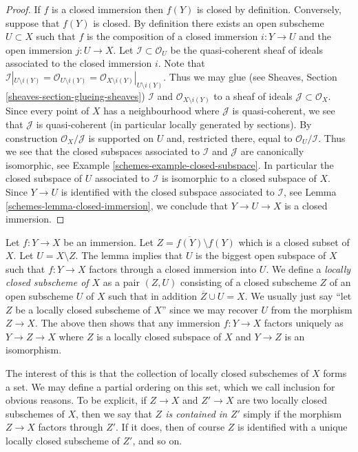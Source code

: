 \begin{proof}

If $f$ is a closed immersion then $f(Y)$ is closed by definition.
Conversely, suppose that $f(Y)$ is closed. By definition
there exists an open subscheme $U \subset X$ such that $f$ is the composition
of a closed immersion $i : Y \to U$ and the open immersion
$j : U \to X$. Let $\mathcal{I} \subset \mathcal{O}_U$ be the
quasi-coherent sheaf of ideals associated to the closed immersion
$i$. Note that
$\mathcal{I}|_{U \setminus i(Y)}
= \mathcal{O}_{U \setminus i(Y)}
= \mathcal{O}_{X \setminus i(Y)}|_{U \setminus i(Y)}$.
Thus we may glue (see Sheaves, Section \ref{sheaves-section-glueing-sheaves})
$\mathcal{I}$ and $\mathcal{O}_{X \setminus i(Y)}$ to a sheaf of
ideals $\mathcal{J} \subset \mathcal{O}_X$. Since every
point of $X$ has a neighbourhood where $\mathcal{J}$ is
quasi-coherent, we see that $\mathcal{J}$ is quasi-coherent
(in particular locally generated by sections).
By construction $\mathcal{O}_X/\mathcal{J}$ is supported
on $U$ and, restricted there, equal to $\mathcal{O}_U/\mathcal{I}$.
Thus we see that the closed subspaces associated to $\mathcal{I}$
and $\mathcal{J}$ are canonically isomorphic, see
Example \ref{schemes-example-closed-subspace}.
In particular the closed subspace of $U$ associated to $\mathcal{I}$
is isomorphic to a closed subspace of $X$.
Since $Y \to U$ is identified with the closed subspace
associated to $\mathcal{I}$, see Lemma \ref{schemes-lemma-closed-immersion},
we conclude that $Y \to U \to X$
is a closed immersion.
\end{proof}

Let $f : Y \to X$ be an immersion.
Let $Z = \overline{f(Y)} \setminus f(Y)$ which is a closed subset of $X$.
Let $U = X \setminus Z$.
The lemma implies that $U$ is the biggest open subspace of $X$
such that $f : Y \to X$ factors through a closed immersion into $U$.
We define a {\it locally closed subscheme of $X$} as a pair
$(Z, U)$ consisting of a closed subscheme $Z$ of an open subscheme $U$
of $X$ such that in addition $\overline{Z} \cup U = X$. We usually
just say ``let $Z$ be a locally closed subscheme of $X$'' since we may
recover $U$ from the morphism $Z \to X$. The above
then shows that any immersion $f : Y \to X$ factors uniquely
as $Y \to Z \to X$ where $Z$ is a locally closed subspace of $X$
and $Y \to Z$ is an isomorphism.

\medskip\noindent
The interest of this is that the collection of locally closed subschemes
of $X$ forms a set. We may define a partial ordering on this set,
which we call inclusion for obvious reasons. To be explicit, if
$Z \to X$ and $Z' \to X$ are two locally closed subschemes of $X$, then
we say that {\it $Z$ is contained in $Z'$} simply if the morphism
$Z \to X$ factors through $Z'$. If it does, then of course $Z$ is identified
with a unique locally closed subscheme of $Z'$, and so on.

